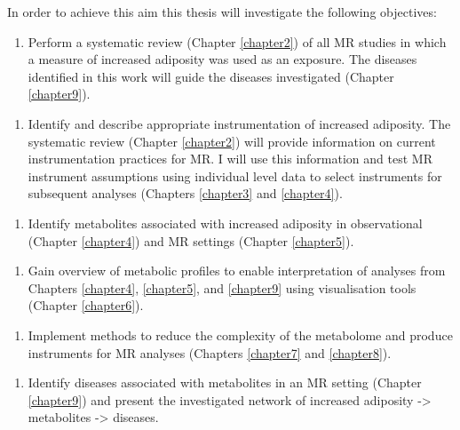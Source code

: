 \documentclass[11pt,twoside]{bristolthesis}
\providecommand{\tightlist}{%
  \setlength{\itemsep}{0pt}\setlength{\parskip}{0pt}}
\begin{document}
In order to achieve this aim this thesis will investigate the following objectives:
\begin{enumerate}
\def\labelenumi{\arabic{enumi}.}
\tightlist
\item
  Perform a systematic review (Chapter \ref{chapter2}) of all MR studies in which a measure of increased adiposity was used as an exposure. The diseases identified in this work will guide the diseases investigated (Chapter \ref{chapter9}). 
\end{enumerate}
\par
\begin{enumerate}
\def\labelenumi{\arabic{enumi}.}
\setcounter{enumi}{1}
\tightlist
\item
  Identify and describe appropriate instrumentation of increased adiposity. The systematic review (Chapter \ref{chapter2}) will provide information on current instrumentation practices for MR. I will use this information and test MR instrument assumptions using individual level data to select instruments for subsequent analyses (Chapters \ref{chapter3} and \ref{chapter4}). 
\end{enumerate}
\par
\begin{enumerate}
\def\labelenumi{\arabic{enumi}.}
\setcounter{enumi}{2}
\tightlist
\item
  Identify metabolites associated with increased adiposity in observational (Chapter \ref{chapter4}) and MR settings (Chapter \ref{chapter5}).
\end{enumerate}
\par
\begin{enumerate}
\def\labelenumi{\arabic{enumi}.}
\setcounter{enumi}{3}
\tightlist
\item
  Gain overview of metabolic profiles to enable interpretation of analyses from Chapters \ref{chapter4}, \ref{chapter5}, and \ref{chapter9} using visualisation tools (Chapter \ref{chapter6}). 
\end{enumerate}
\par
\begin{enumerate}
\def\labelenumi{\arabic{enumi}.}
\setcounter{enumi}{3}
\tightlist
\item
  Implement methods to reduce the complexity of the metabolome and produce instruments for MR analyses (Chapters \ref{chapter7} and \ref{chapter8}). 
\end{enumerate}
\par
\begin{enumerate}
\def\labelenumi{\arabic{enumi}.}
\setcounter{enumi}{4}
\tightlist
\item
  Identify diseases associated with metabolites in an MR setting (Chapter \ref{chapter9}) and present the investigated network of increased adiposity -\textgreater{} metabolites -\textgreater{} diseases. 
\end{enumerate}
\newpage
\end{document}
